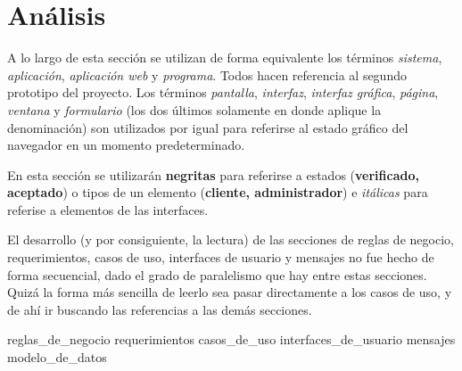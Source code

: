 %
%
%

\section{Análisis}

A lo largo de esta sección se utilizan de forma equivalente los términos
\textit{sistema}, \textit{aplicación}, \textit{aplicación web} y
\textit{programa}. Todos hacen referencia al segundo prototipo del
proyecto. Los términos \textit{pantalla}, \textit{interfaz},
\textit{interfaz gráfica}, \textit{página}, \textit{ventana} y
\textit{formulario} (los dos últimos solamente en donde aplique la
denominación) son utilizados por igual para referirse al estado gráfico
del navegador en un momento predeterminado.

En esta sección se utilizarán \textbf{negritas} para referirse a estados
(\textbf{verificado, aceptado}) o tipos de un elemento
(\textbf{cliente, administrador}) e \textit{itálicas} para referise a elementos
de las interfaces.

El desarrollo (y por consiguiente, la lectura) de las secciones de reglas de
negocio, requerimientos, casos de uso, interfaces de usuario y mensajes no fue
hecho de forma secuencial, dado el grado de paralelismo que hay entre estas
secciones. Quizá la forma más sencilla de leerlo sea pasar directamente a los
casos de uso, y de ahí ir buscando las referencias a las demás secciones.

{reglas_de_negocio}
{requerimientos}
{casos_de_uso}
{interfaces_de_usuario}
{mensajes}
{modelo_de_datos}
